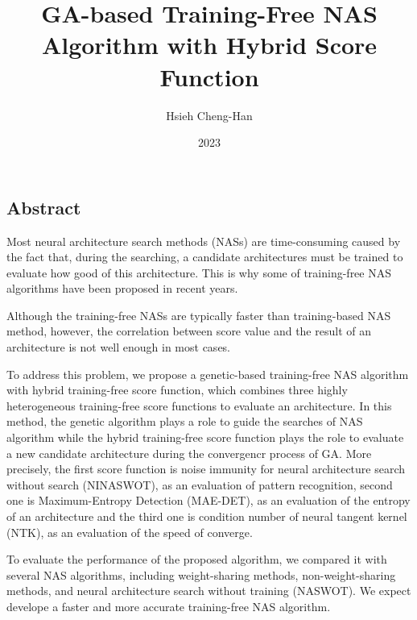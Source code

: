 \documentclass[twocolumn,10pt]{article}
\title{GA-based Training-Free NAS Algorithm with Hybrid Score Function}
\author{Hsieh Cheng-Han}
\date{2023}
\begin{document}
\begin{CJK*}{UTF8}{bsmi}

\maketitle

\section{Abstract}

    Most neural architecture search methods (NASs) are time-consuming caused by 
    the fact that, during the searching, a candidate architectures must be 
    trained to evaluate how good of this architecture. This is why some of 
    training-free NAS algorithms have been proposed in recent years.

    Although the training-free NASs are typically faster than training-based 
    NAS method, however, the correlation between score value and the result 
    of an architecture is not well enough in most cases.
    
    To address this problem, we propose a genetic-based training-free NAS 
    algorithm with hybrid training-free score function, which combines three 
    highly heterogeneous training-free score functions to evaluate an architecture. 
    In this method, the genetic algorithm plays a role to guide the searches 
    of NAS algorithm while the hybrid training-free score function plays the 
    role to evaluate a new candidate architecture during the convergencr process 
    of GA. More precisely, the first score function is noise immunity for 
    neural architecture search without search (NINASWOT), as an evaluation of 
    pattern recognition, second one is Maximum-Entropy Detection (MAE-DET), 
    as an evaluation of the entropy of an architecture and the third one is 
    condition number of neural tangent kernel (NTK), as an evaluation of 
    the speed of converge.
    
    To evaluate the performance of the proposed algorithm, we compared it 
    with several NAS algorithms, including weight-sharing methods, 
    non-weight-sharing methods, and neural architecture search without training (NASWOT). 
    We expect develope a faster and more accurate training-free NAS algorithm.

\begin{thebibliography}{9}
\end{thebibliography}


\end{CJK*}
\end{document}
